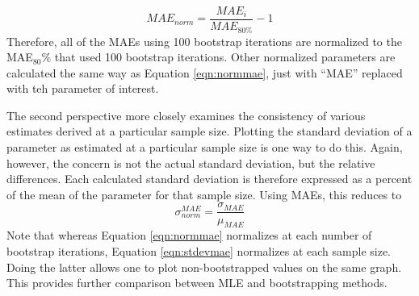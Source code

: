 \documentclass[titlepage,12pt,times,nopageno]{article}
\begin{document}
\begin{equation}
MAE_{norm}=\frac{MAE_i}{MAE_{80\%}}-1 \label{eqn:normmae}
\end{equation}
Therefore, all of the MAEs using 100 bootstrap iterations are normalized to the MAE$_80\%$ that used 100 bootstrap iterations.  Other normalized parameters are calculated the same way as Equation \ref{eqn:normmae}, just with ``MAE'' replaced with teh parameter of interest.\par
The second perspective more closely examines the consistency of various estimates derived at a particular sample size.  Plotting the standard deviation of a parameter as estimated at a particular sample size is one way to do this.  Again, however, the concern is not the actual standard deviation, but the relative differences.  Each calculated standard deviation is therefore expressed as a percent of the mean of the parameter for that sample size.  Using MAEs, this reduces to
\begin{equation}
\sigma_{norm}^{MAE}=\frac{\sigma_{MAE}}{\mu_{MAE}} \label{eqn:stdevmae}
\end{equation}
Note that whereas Equation \ref{eqn:normmae} normalizes at each number of bootstrap iterations, Equation \ref{eqn:stdevmae} normalizes at each sample size.  Doing the latter allows one to plot non-bootstrapped values on the same graph.  This provides further comparison between MLE and bootstrapping methods.
\end{document}
